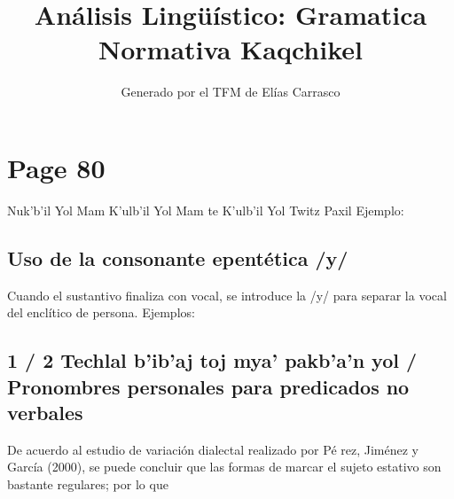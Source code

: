 \documentclass{article}%
\title{Análisis Lingüístico: Gramatica Normativa Kaqchikel}%
\author{Generado por el TFM de Elías Carrasco}%
\begin{document}
%
\normalsize%
\maketitle%
\section{Page 80}%
\label{sec:Page80}%
Nuk’b’il Yol Mam %
K’ulb’il Yol Mam te K’ulb’il Yol Twitz Paxil %
Ejemplo: %
\subsection{Uso de la consonante epentética /y/}%
\label{subsec:Usodelaconsonanteepenttica/y/}%

%
Cuando el sustantivo finaliza con vocal, se introduce la /y/ para %
separar la vocal del enclítico de persona. %
Ejemplos: %
\subsection{1 / 2 Techlal b’ib’aj toj mya’ pakb’a’n yol / Pronombres personales para predicados no verbales}%
\label{subsec:1/2Techlalbibajtojmyapakbanyol/Pronombrespersonalesparapredicadosnoverbales}%

%
De acuerdo al estudio de variación dialectal realizado por Pé rez, Jiménez y García (2000), se puede concluir que las formas de marcar el sujeto estativo son bastante regulares; por lo que 

%
\end{document}
